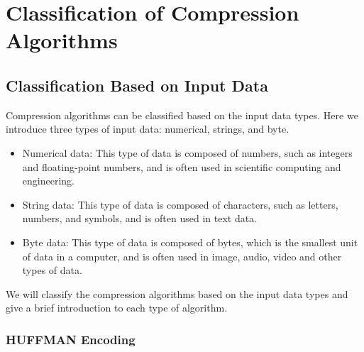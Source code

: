 \documentclass[sigconf]{acmart}
\begin{document}
\section{Classification of Compression Algorithms}

\subsection{Classification Based on Input Data}

    Compression algorithms can be classified based on the input data types. Here we introduce three types of input data: numerical, strings, and byte.\\
    \begin{itemize}
        \item Numerical data: This type of data is composed of numbers, such as integers and floating-point numbers, and is often used in scientific computing and engineering.
        \item String data: This type of data is composed of characters, such as letters, numbers, and symbols, and is often used in text data.
        \item Byte data: This type of data is composed of bytes, which is the smallest unit of data in a computer, and is often used in image, audio, video and other types of data.
    \end{itemize}
    We will classify the compression algorithms based on the input data types and give a brief introduction to each type of algorithm.

\subsubsection*{HUFFMAN Encoding}
\end{document}
